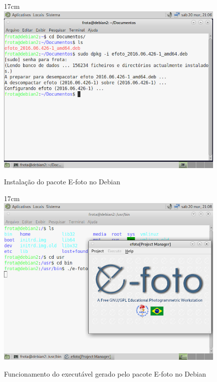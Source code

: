 \begin{figure}[!ht]{17cm}
	\centering
	\includegraphics[width=15cm]{Figuras/debian_insta.jpg}
	\caption{Instalação do pacote E-foto no Debian} \label{fig:debian_insta}
\end{figure}

\begin{figure}[!ht]{17cm}
	\centering
	\includegraphics[width=15cm]{Figuras/debian_exec.jpg}
	\caption{Funcionamento do executável gerado pelo pacote E-foto no Debian} \label{fig:debian_exec}
\end{figure}

